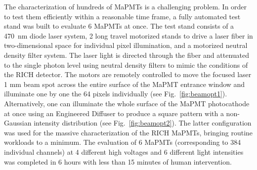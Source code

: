 \documentclass[5p,times,twocolumn]{elsarticle}
\begin{document}
The characterization of hundreds of MaPMTs is a  challenging problem. In order to test them efficiently within a
reasonable time frame, a fully automated test stand was built to evaluate 6 MaPMTs at once. The test stand consists
of a 470~nm diode laser system, 2 long travel motorized stands to drive a laser fiber in two-dimensional space for
individual pixel illumination, and a motorized neutral density filter system. The laser light is directed through the
fiber and attenuated to the single photon level using neutral density filters to mimic the conditions of the RICH
detector. The motors are remotely controlled to move the focused laser 1 mm beam spot across the entire surface of the MaPMT
entrance window and illuminate one by one the 64 pixels individually (see Fig.~\ref{fig:beamopt1}). Alternatively, one
can illuminate the whole surface of the MaPMT photocathode at once using an Engineered Diffuser to produce a square
pattern with a non-Gaussian intensity distribution (see Fig.~\ref{fig:beamopt2}). The latter configuration was used for the
massive characterization of the RICH MaPMTs, bringing routine workloads to a minimum. The evaluation of 6 MaPMTs
(corresponding to 384 individual channels) at 4 different high voltages and 6 different light intensities was completed
in 6 hours with less than 15 minutes of human intervention.
\end{document}
